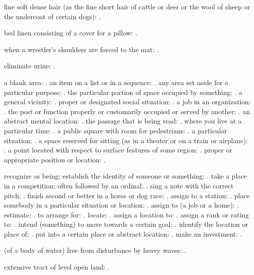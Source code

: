   fine soft dense hair (as the fine short hair of cattle or deer or the wool of sheep or the undercoat of certain dogs): .

  bed linen consisting of a cover for a pillow: .

  when a wrestler's shoulders are forced to the mat: .

  eliminate urine: .

  a blank area: . an item on a list or in a sequence: . any area set aside for a particular purpose: . the particular portion of space occupied by something: . a general vicinity: . proper or designated social situation: . a job in an organization: . the post or function properly or customarily occupied or served by another: . an abstract mental location: . the passage that is being read: . where you live at a particular time: . a public square with room for pedestrians: . a particular situation: . a space reserved for sitting (as in a theater or on a train or airplane): . a point located with respect to surface features of some region: . proper or appropriate position or location: .

  recognize as being; establish the identity of someone or something: . take a place in a competition; often followed by an ordinal: . sing a note with the correct pitch: . finish second or better in a horse or dog race: . assign to a station: . place somebody in a particular situation or location: . assign to (a job or a home): . estimate: . to arrange for: . locate: . assign a location to: . assign a rank or rating to: . intend (something) to move towards a certain goal: . identify the location or place of: . put into a certain place or abstract location: . make an investment: .

  (of a body of water) free from disturbance by heavy waves: .

  extensive tract of level open land: .

